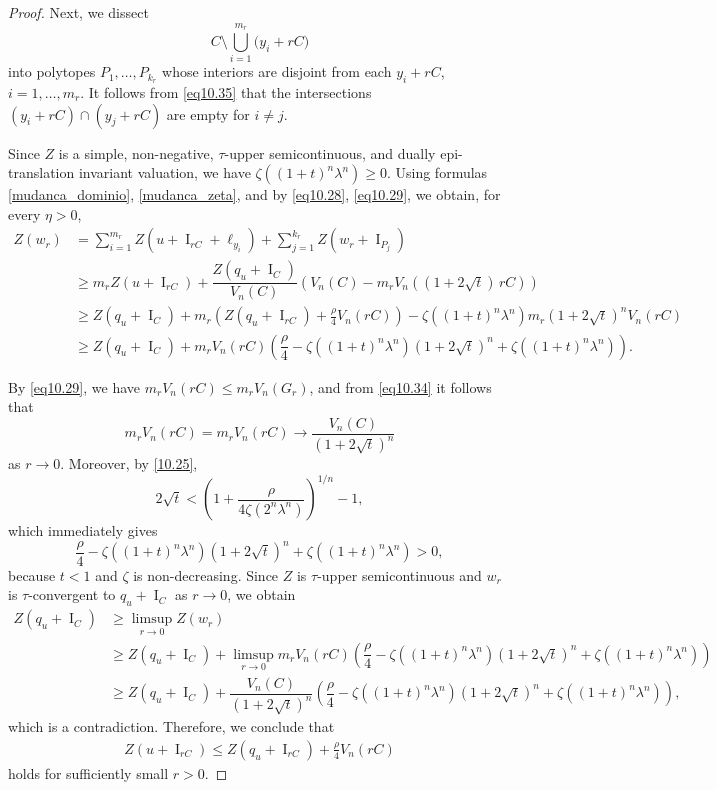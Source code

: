 \documentclass[11pt]{article}
\theoremstyle{definition} %
\DeclareMathOperator{\I}{I}
\begin{document}
\begin{proof}
 
Next, we dissect
$$
C \setminus \bigcup_{i=1}^{m_r} \bigl( y_i +  rC \bigr)
$$
into polytopes $P_1, \dots, P_{k_r}$ whose interiors are disjoint from each $y_i +  rC$, $i=1,\dots,m_r$. It follows from \eqref{eq10.35} that the intersections $(y_i + rC) \cap (y_j + rC)$ are empty for $i \neq j$.



Since $Z$ is a simple, non-negative, $\tau$-upper semicontinuous, and dually epi-translation invariant valuation,  we have $\zeta((1+t)^n\lambda^n)\geq 0$.    Using formulas \eqref{mudanca_dominio}, \eqref{mudanca_zeta}, and  by \eqref{eq10.28}, \eqref{eq10.29}, we obtain, for every $\eta > 0$,
\begin{align*}
    Z(w_r) &=  \sum_{i=1}^{m_r}Z(u + \I_{rC}+\ell_{y_i}) +  \sum_{j=1}^{k_r}Z(w_r+\I_{P_j})\\
    &\geq  m_r Z(u + \I_{rC}) + \dfrac{Z(q_u+\I_C)}{V_n(C)}(V_n(C)-m_rV_n((1+2\sqrt{t})\,rC))\\
    &\geq Z(q_u+\I_C)+m_r\left(Z(q_u+\I_{rC})+\frac{\rho}{4}V_n(rC)\right) -\zeta((1+t)^n\lambda^n)m_r(1+2\sqrt{t})^nV_n(rC)\\
    &\geq Z(q_u+\I_C) + m_rV_n(rC)\left(\dfrac{\rho}{4}-\zeta((1+t)^n\lambda^n)(1+2\sqrt{t})^n+\zeta((1+t)^n\lambda^n)\right).
\end{align*}


By \eqref{eq10.29}, we have $m_rV_n(rC)\leq m_rV_n(G_r)$, and from \eqref{eq10.34} it follows that
$$m_rV_n(rC)= m_rV_n(rC)\rightarrow  \dfrac{V_n(C)}{(1+2\sqrt{t})^n}$$
as $r\rightarrow 0$. Moreover, by \eqref{10.25}, 
$$2\sqrt{t}< \left(1+\dfrac{\rho}{4\zeta(2^n\lambda^n)}\right)^{1/n}-1,$$ 
which immediately gives  
$$ \dfrac{\rho}{4}-\zeta((1+t)^n\lambda^n)(1+2\sqrt{t})^n+\zeta((1+t)^n\lambda^n)> 0,$$
because $t<1$ and $\zeta$ is non-decreasing. 
Since $Z$ is $\tau$-upper semicontinuous and $w_r$ is  $\tau$-convergent to $q_u+\I_C$ as $r\rightarrow 0$, we obtain
\begin{align*}
 Z(q_u+\I_C)   & \geq \limsup_{r\rightarrow 0} Z(w_r)\\
 & \geq Z(q_u+\I_C)  + \limsup_{r\rightarrow 0}   m_rV_n(rC)\left(\dfrac{\rho}{4}-\zeta((1+t)^n\lambda^n)(1+2\sqrt{t})^n+\zeta((1+t)^n\lambda^n)\right)\\
 & \geq  Z(q_u+\I_C) +\dfrac{V_n(C)}{(1+2\sqrt{t})^n}\left(\dfrac{\rho}{4}-\zeta((1+t)^n\lambda^n)(1+2\sqrt{t})^n+\zeta((1+t)^n\lambda^n)\right),
\end{align*}
which is a contradiction. Therefore, we conclude that
\begin{align}\label{eq10.38}
Z(u + \I_{rC})\leq Z(q_u+\I_{rC})+\frac{\rho}{4}V_n(rC)
\end{align}
holds for  sufficiently small $r>0$.
\end{proof}
\end{document}
